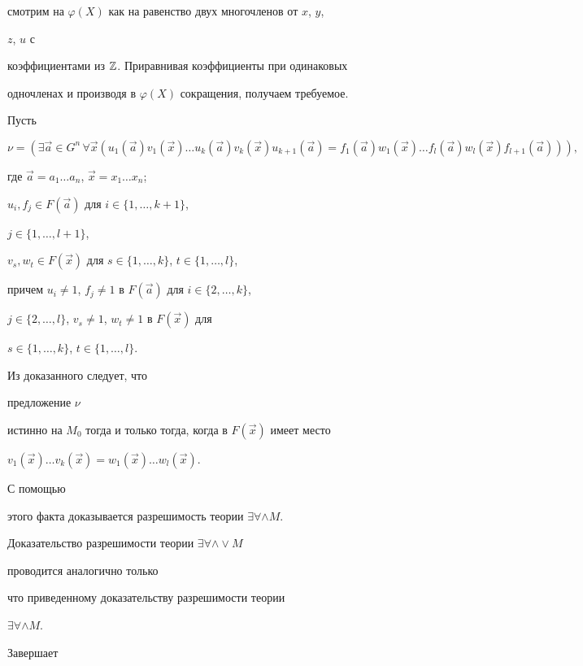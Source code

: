 смотрим на $\varphi(X)$ как на равенство двух многочленов от $x$, $y$, 


$z$, $u$ с 


коэффициентами из $\Bbb Z$. Приравнивая коэффициенты при одинаковых 


одночленах и производя в $\varphi(X)$ сокращения, получаем требуемое. 


 


Пусть 


$$ 


\nu=(\exists\Vec a\in G^n\,\forall\Vec x(u_1(\Vec a)v_1(\Vec x)\dotsc 


u_k(\Vec a)v_k(\Vec x)u_{k+1}(\Vec a)= 


f_1(\Vec a)w_1(\Vec x)\dotsc f_l(\Vec a) 


w_l(\Vec x)f_{l+1}(\Vec a))), 


$$ 


где $\Vec a=a_1\dotsc a_n$, $\Vec x=x_1\dotsc x_n$; 


$u_i,f_j\in F(\Vec a)$ для $i\in\{1,\dotsc,k+1\}$, 


$j\in\{1,\dotsc,l+1\}$, 


$v_s,w_t\in F(\Vec x)$ для $s\in\{1,\dotsc,k\}$, $t\in\{1,\dotsc,l\}$, 


причем $u_i\ne 1$, $f_j\ne 1$ в $F(\Vec a)$ для $i\in\{2,\dotsc,k\}$, 


$j\in\{2,\dotsc,l\}$, $v_s\ne 1$, $w_t\ne 1$ в $F(\Vec x)$ для 


$s\in\{1,\dotsc,k\}$, $t\in\{1,\dotsc,l\}$. 


Из доказанного следует, что 


предложение $\nu$ 


истинно на $M_0$ тогда и только тогда, когда в $F(\Vec x)$ имеет место 


$v_1(\Vec x)\dotsc v_k(\Vec x)=w_1(\Vec x)\dotsc w_l(\Vec x)$. 


С помощью 


этого факта доказывается разрешимость теории $\exists\forall\wedge M$. 


 


Доказательство разрешимости теории $\exists\forall\wedge\vee M$ 


проводится аналогично только 


что приведенному доказательству разрешимости теории 


$\exists\forall\wedge M$. 


Завершает 


